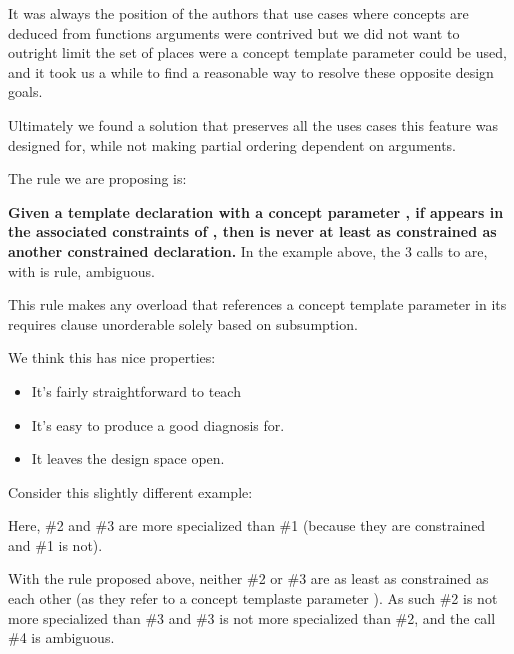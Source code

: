 \documentclass{wg21}
\begin{document}
It was always the position of the authors that use cases where concepts are deduced from functions arguments were contrived but
we did not want to outright limit the set of places were a concept template parameter could be used,
and it took us a while to find a reasonable way to resolve these opposite design goals.

Ultimately we found a solution that preserves all the uses cases this feature was designed for,
while not making partial ordering dependent on arguments.

The rule we are proposing is:

\textbf{Given a template declaration  with a concept parameter , if  appears in the associated constraints of , then  is never at least as constrained as another constrained declaration.}
In the example above, the 3 calls to  are, with is rule, ambiguous.

This rule makes any overload that references a concept template parameter in its requires clause unorderable solely based on subsumption.


We think this has nice properties:
\begin{itemize}
    \item It's fairly straightforward to teach
    \item It's easy to produce a good diagnosis for.
    \item It leaves the design space open.
\end{itemize}

Consider this slightly different example:


Here, \#2 and \#3 are more specialized than \#1 (because they are constrained and \#1 is not).

With the rule proposed above, neither \#2 or \#3 are as least as constrained as each other (as they refer to a concept templaste parameter ).
As such \#2 is not more specialized than \#3 and \#3 is not more specialized than \#2, and the call \#4 is ambiguous.
\end{document}
